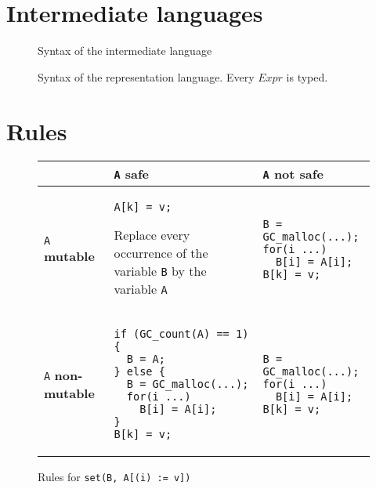 \documentclass[12pt,a4paper]{article}
\newcommand{\cl}[1]{\texttt{#1}}
\newcommand{\mut}{\textbf{mutable }}
\newcommand{\nmut}{\textbf{non-mutable }}
\newcommand{\safe}{\textbf{safe }}
\begin{document}
\newpage
\section{Intermediate languages}

\begin{figure}[!ht]

\caption{Syntax of the intermediate language}
\label{fig:aux-syntax}
\end{figure}

\newpage
\begin{figure}[!ht]

\caption{Syntax of the representation language. Every $Expr$ is typed.}
\label{fig:Csyntax}
\end{figure}



\newpage
\section{Rules}
\label{Rules}


\begin{figure}[!ht]
\begin{tabular}{|p{4.5cm}|p{6cm}|p{6.5cm}|}
\hline
             & \cl{A} \safe & \cl{A} not \safe \\ \hline
\cl{A} \mut  &
\begin{lstlisting}
A[k] = v;
\end{lstlisting}
Replace every occurrence of the variable \cl{B} by the variable \cl{A} & \begin{lstlisting}
B = GC_malloc(...);
for(i ...)
  B[i] = A[i];
B[k] = v;
\end{lstlisting} \\ \hline
\cl{A} \nmut & \begin{lstlisting}
if (GC_count(A) == 1) {
  B = A;
} else {
  B = GC_malloc(...);
  for(i ...)
    B[i] = A[i];
}
B[k] = v;
\end{lstlisting} & \begin{lstlisting}
B = GC_malloc(...);
for(i ...)
  B[i] = A[i];
B[k] = v;
\end{lstlisting} \\ \hline
\end{tabular}
\caption{Rules for \cl{set(B, A[(i) := v])}}
\end{figure}
\end{document}
